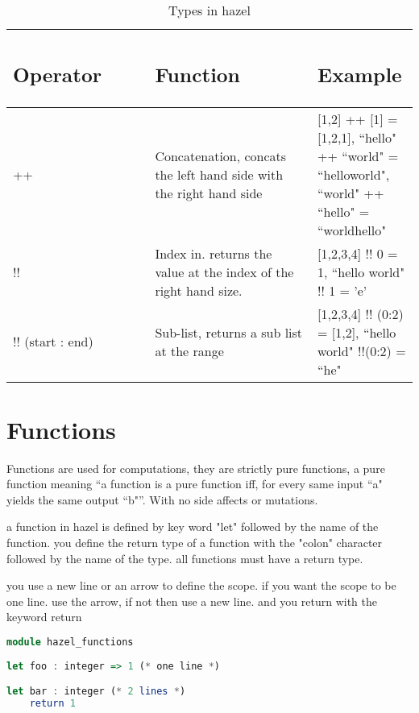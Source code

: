 \documentclass{article}
\begin{document}
\begin{table}[H]
    \centering
    \begin{tabular}{p{0.35\linewidth} | p{0.4\linewidth}| p{0.4\linewidth} | }
      
\subsection*{Operator} & \subsection*{Function} & \subsection*{Example}
 \\ \hline
      ++ & Concatenation, concats the left hand side with the right hand side & [1,2] ++ [1] = [1,2,1], ``hello" ++ ``world" = ``helloworld", ``world" ++ ``hello" =  ``worldhello" \\ \hline
      !! & Index in. returns the value at the index of the right hand size.  &  [1,2,3,4] !! 0 = 1, ``hello world" !! 1 = 'e' \\ \hline
      !! (start : end) & Sub-list, returns a sub list at the range  & [1,2,3,4] !! (0:2) = [1,2], ``hello world" !!(0:2) = ``he" \\ \hline      
    \end{tabular}
        \caption{Types in hazel}
\end{table}

\section{Functions}

Functions are used for computations, they are strictly pure functions, a pure function meaning ``a function is a pure function iff, for every same input ``a" yields the same output ``b"”. With no side affects or mutations.

a function in hazel is defined by key word "let" followed by the name of the function.  
you define the return type of a function with the "colon" character followed by the name of the type.
all functions must have a return type. 

you use a new line or an arrow to define the scope. if you want the scope to be one line. use the arrow, if not then use a new line. and you return with the keyword return 

\begin{lstlisting}[language=Haskell, caption=Function definition]
module hazel_functions
        
let foo : integer => 1 (* one line *)

let bar : integer (* 2 lines *)
    return 1 

\end{lstlisting}
\end{document}
